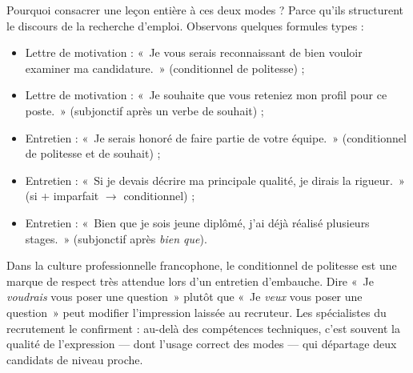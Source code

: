 \documentclass[11pt]{article}
\begin{document}
Pourquoi consacrer une leçon entière à ces deux modes ? Parce qu'ils structurent le discours de la recherche d'emploi. Observons quelques formules types :

\begin{itemize}
\item Lettre de motivation : «~Je vous serais reconnaissant de bien vouloir examiner ma candidature.~» (conditionnel de politesse) ;
\item Lettre de motivation : «~Je souhaite que vous reteniez mon profil pour ce poste.~» (subjonctif après un verbe de souhait) ;
\item Entretien : «~Je serais honoré de faire partie de votre équipe.~» (conditionnel de politesse et de souhait) ;
\item Entretien : «~Si je devais décrire ma principale qualité, je dirais la rigueur.~» (si + imparfait $\rightarrow$ conditionnel) ;
\item Entretien : «~Bien que je sois jeune diplômé, j'ai déjà réalisé plusieurs stages.~» (subjonctif après \emph{bien que}).
\end{itemize}

\begin{savaistu}
Dans la culture professionnelle francophone, le conditionnel de politesse est une marque de respect très attendue lors d'un entretien d'embauche. Dire «~Je \emph{voudrais} vous poser une question~» plutôt que «~Je \emph{veux} vous poser une question~» peut modifier l'impression laissée au recruteur. Les spécialistes du recrutement le confirment : au-delà des compétences techniques, c'est souvent la qualité de l'expression — dont l'usage correct des modes — qui départage deux candidats de niveau proche.
\end{savaistu}
\end{document}
